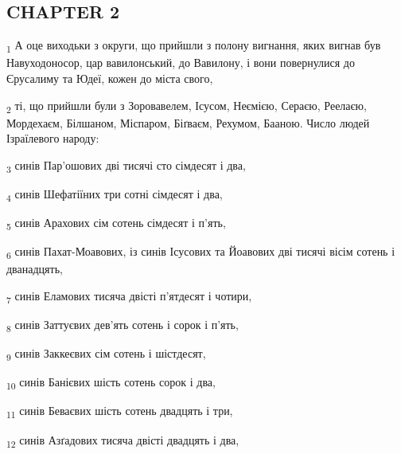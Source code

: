 \subsection{CHAPTER 2}
\begin{tcolorbox}
\textsubscript{1} А оце виходьки з округи, що прийшли з полону вигнання, яких вигнав був Навуходоносор, цар вавилонський, до Вавилону, і вони повернулися до Єрусалиму та Юдеї, кожен до міста свого,
\end{tcolorbox}
\begin{tcolorbox}
\textsubscript{2} ті, що прийшли були з Зоровавелем, Ісусом, Неємією, Сераєю, Реелаєю, Мордехаєм, Білшаном, Міспаром, Біґваєм, Рехумом, Бааною. Число людей Ізраїлевого народу:
\end{tcolorbox}
\begin{tcolorbox}
\textsubscript{3} синів Пар'ошових дві тисячі сто сімдесят і два,
\end{tcolorbox}
\begin{tcolorbox}
\textsubscript{4} синів Шефатіїних три сотні сімдесят і два,
\end{tcolorbox}
\begin{tcolorbox}
\textsubscript{5} синів Арахових сім сотень сімдесят і п'ять,
\end{tcolorbox}
\begin{tcolorbox}
\textsubscript{6} синів Пахат-Моавових, із синів Ісусових та Йоавових дві тисячі вісім сотень і дванадцять,
\end{tcolorbox}
\begin{tcolorbox}
\textsubscript{7} синів Еламових тисяча двісті п'ятдесят і чотири,
\end{tcolorbox}
\begin{tcolorbox}
\textsubscript{8} синів Заттуєвих дев'ять сотень і сорок і п'ять,
\end{tcolorbox}
\begin{tcolorbox}
\textsubscript{9} синів Заккеєвих сім сотень і шістдесят,
\end{tcolorbox}
\begin{tcolorbox}
\textsubscript{10} синів Банієвих шість сотень сорок і два,
\end{tcolorbox}
\begin{tcolorbox}
\textsubscript{11} синів Беваєвих шість сотень двадцять і три,
\end{tcolorbox}
\begin{tcolorbox}
\textsubscript{12} синів Азґадових тисяча двісті двадцять і два,
\end{tcolorbox}
